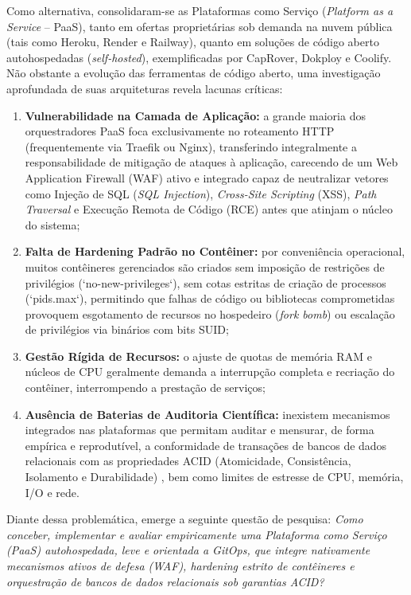 Como alternativa, consolidaram-se as Plataformas como Serviço (\textit{Platform as a Service} -- PaaS), tanto em ofertas proprietárias sob demanda na nuvem pública (tais como Heroku, Render e Railway), quanto em soluções de código aberto autohospedadas (\textit{self-hosted}), exemplificadas por CapRover, Dokploy e Coolify. Não obstante a evolução das ferramentas de código aberto, uma investigação aprofundada de suas arquiteturas revela lacunas críticas:
\begin{enumerate}[label=(\alph*)]
    \item \textbf{Vulnerabilidade na Camada de Aplicação:} a grande maioria dos orquestradores PaaS foca exclusivamente no roteamento HTTP (frequentemente via Traefik ou Nginx), transferindo integralmente a responsabilidade de mitigação de ataques à aplicação, carecendo de um Web Application Firewall (WAF) ativo e integrado capaz de neutralizar vetores como Injeção de SQL (\textit{SQL Injection}), \textit{Cross-Site Scripting} (XSS), \textit{Path Traversal} e Execução Remota de Código (RCE) antes que atinjam o núcleo do sistema;
    \item \textbf{Falta de Hardening Padrão no Contêiner:} por conveniência operacional, muitos contêineres gerenciados são criados sem imposição de restrições de privilégios (`no-new-privileges`), sem cotas estritas de criação de processos (`pids.max`), permitindo que falhas de código ou bibliotecas comprometidas provoquem esgotamento de recursos no hospedeiro (\textit{fork bomb}) ou escalação de privilégios via binários com bits SUID;
    \item \textbf{Gestão Rígida de Recursos:} o ajuste de quotas de memória RAM e núcleos de CPU geralmente demanda a interrupção completa e recriação do contêiner, interrompendo a prestação de serviços;
    \item \textbf{Ausência de Baterias de Auditoria Científica:} inexistem mecanismos integrados nas plataformas que permitam auditar e mensurar, de forma empírica e reprodutível, a conformidade de transações de bancos de dados relacionais com as propriedades ACID (Atomicidade, Consistência, Isolamento e Durabilidade) \cite{stonebraker1986}, bem como limites de estresse de CPU, memória, I/O e rede.
\end{enumerate}

Diante dessa problemática, emerge a seguinte questão de pesquisa: \textit{Como conceber, implementar e avaliar empiricamente uma Plataforma como Serviço (PaaS) autohospedada, leve e orientada a GitOps, que integre nativamente mecanismos ativos de defesa (WAF), hardening estrito de contêineres e orquestração de bancos de dados relacionais sob garantias ACID?}


